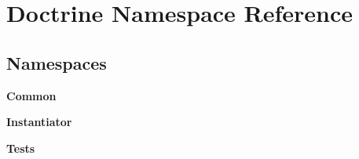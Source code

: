 \section{Doctrine Namespace Reference}
\label{namespace_doctrine}
\subsection*{Namespaces}
\begin{DoxyCompactItemize}
\item 
 {\bf Common}
\item 
 {\bf Instantiator}
\item 
 {\bf Tests}
\end{DoxyCompactItemize}
